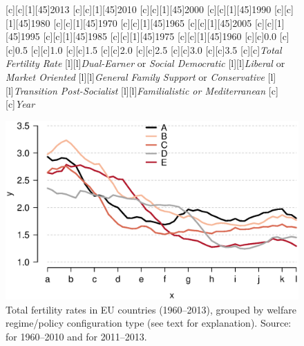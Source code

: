 \documentclass[11 pt, a4paper]{report}
\begin{document}
\begin{figure}[hbtp!]
[c][c][1][45]{\scriptsize{2013}}
[c][c][1][45]{\scriptsize{2010}}
[c][c][1][45]{\scriptsize{2000}}
[c][c][1][45]{\scriptsize{1990}}
[c][c][1][45]{\scriptsize{1980}}
[c][c][1][45]{\scriptsize{1970}}
[c][c][1][45]{\scriptsize{1965}}
[c][c][1][45]{\scriptsize{2005}}
[c][c][1][45]{\scriptsize{1995}}
[c][c][1][45]{\scriptsize{1985}}
[c][c][1][45]{\scriptsize{1975}}
[c][c][1][45]{\scriptsize{1960}}
[c][c]{\small{0.0}}
[c][c]{\small{0.5}}
[c][c]{\small{1.0}}
[c][c]{\small{1.5}}
[c][c]{\small{2.0}}
[c][c]{\small{2.5}}
[c][c]{\small{3.0}}
[c][c]{\small{3.5}}
[c][c]{\small{\emph{Total Fertility Rate}}}
[l][l]{\emph{Dual-Earner} or \emph{Social Democratic}}
[l][l]{\emph{Liberal} or \emph{Market Oriented}}
[l][l]{\emph{General Family Support} or \emph{Conservative}}
[l][l]{\emph{Transition Post-Socialist}}
[l][l]{\emph{Familialistic or Mediterranean}}
[c][c]{\emph{Year}}

\includegraphics[width=\textwidth]{../figures/Fig1.3.eps}
\caption{Total fertility rates in EU countries (1960--2013), grouped by welfare regime/policy configuration type (see text for explanation). Source: \citet{INED2016} for 1960--2010 and \citet{EUST2016} for 2011--2013.}
\label{Fig:03.1}
\end{figure}
\end{document}
